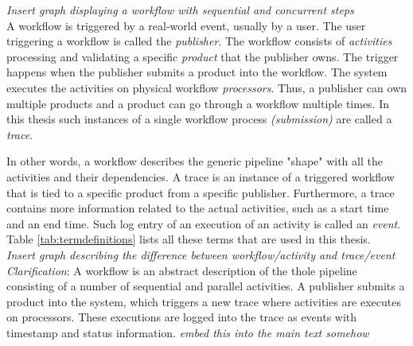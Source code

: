 \documentclass[english,12pt,a4paper,pdftex,sci,utf8]{aaltothesis}
\newcommand{\nyi}[1]{\colorbox{nyibg}{\textcolor{nyitext}{\emph{#1}}}}
\begin{document}
\nyi{Insert graph displaying a workflow with sequential and concurrent steps}\\

A workflow is triggered by a real-world event, usually by a user.
The user triggering a workflow is called the \emph{publisher}.
The workflow consists of \emph{activities} processing and validating a specific \emph{product} that the publisher owns.
The trigger happens when the publisher submits a product into the workflow.
The system executes the activities on physical workflow \emph{processors}.
Thus, a publisher can own multiple products and a product can go through a workflow multiple times.
In this thesis such instances of a single workflow process \emph{(submission)} are called a \emph{trace}.

In other words, a workflow describes the generic pipeline "shape" with all the activities and their dependencies.
A trace is an instance of a triggered workflow that is tied to a specific product from a specific publisher.
Furthermore, a trace contains more information related to the actual activities, such as a start time and an end time.
Such log entry of an execution of an activity is called an \emph{event}. Table \ref{tab:termdefinitions} lists all these terms that are used in this thesis.\\

\nyi{Insert graph describing the difference between workflow/activity and trace/event}\\

\nyi{Clarification}: A workflow is an abstract description of the thole pipeline consisting of a number of sequential and parallel activities. A publisher submits a product into the system, which triggers a new trace where activities are executes on processors. These executions are logged into the trace as events with timestamp and status information.
\nyi{embed this into the main text somehow}
\end{document}
